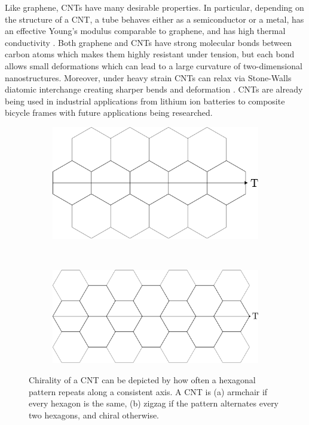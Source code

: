 	Like graphene, CNTs have many desirable properties. In particular, depending on the structure of a CNT, a tube behaves either as a semiconductor or a metal, has an effective Young's modulus comparable to graphene, and has high thermal conductivity \cite{Dresselhaus2004}. Both graphene and CNTs have strong molecular bonds between carbon atoms which makes them highly resistant under tension, but each bond allows small deformations which can lead to a large curvature of two-dimensional nanostructures. Moreover, under heavy strain CNTs can relax via Stone-Walls diatomic interchange creating sharper bends and deformation \cite{Yakobson1998}. CNTs are already being used in industrial applications from lithium ion batteries to composite bicycle frames \cite{De2013} with future applications being researched.
	
	\begin{figure}[t!]
		\centering
		\begin{subfigure}[t]{.5\textwidth}
			\centering
			\includegraphics[scale=.25]{./old_fig/Chirality_Armchair.eps}
			\caption{\label{subfig:Armchair}}
		\end{subfigure}%
		~
		\begin{subfigure}[t]{.5\textwidth}
			\centering
			\includegraphics[scale=.25]{./old_fig/Chirality_Zigzag.eps}
			\caption{\label{subfig:Zigzag}}
		\end{subfigure}		
		\caption{Chirality of a CNT can be depicted by how often a hexagonal pattern repeats along a consistent axis. A CNT is (a) armchair if every hexagon is the same, (b) zigzag if the pattern alternates every two hexagons, and chiral otherwise.\label{fig:Chirality}}	
	\end{figure}
	
